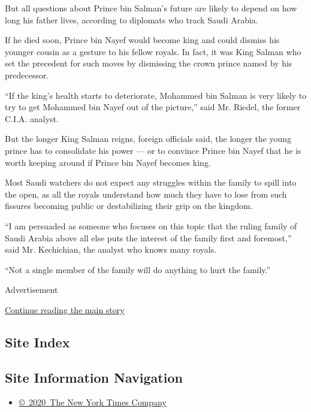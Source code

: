But all questions about Prince bin Salman's future are likely to depend
on how long his father lives, according to diplomats who track Saudi
Arabia.

If he died soon, Prince bin Nayef would become king and could dismiss
his younger cousin as a gesture to his fellow royals. In fact, it was
King Salman who set the precedent for such moves by dismissing the crown
prince named by his predecessor.

``If the king's health starts to deteriorate, Mohammed bin Salman is
very likely to try to get Mohammed bin Nayef out of the picture,'' said
Mr. Riedel, the former C.I.A. analyst.

But the longer King Salman reigns, foreign officials said, the longer
the young prince has to consolidate his power --- or to convince Prince
bin Nayef that he is worth keeping around if Prince bin Nayef becomes
king.

Most Saudi watchers do not expect any struggles within the family to
spill into the open, as all the royals understand how much they have to
lose from such fissures becoming public or destabilizing their grip on
the kingdom.

``I am persuaded as someone who focuses on this topic that the ruling
family of Saudi Arabia above all else puts the interest of the family
first and foremost,'' said Mr. Kechichian, the analyst who knows many
royals.

``Not a single member of the family will do anything to hurt the
family.''

Advertisement

\protect\hyperlink{after-bottom}{Continue reading the main story}

\hypertarget{site-index}{%
\subsection{Site Index}\label{site-index}}

\hypertarget{site-information-navigation}{%
\subsection{Site Information
Navigation}\label{site-information-navigation}}

\begin{itemize}
\tightlist
\item
  \href{https://help.nytimes3xbfgragh.onion/hc/en-us/articles/115014792127-Copyright-notice}{©~2020~The
  New York Times Company}
\end{itemize}

